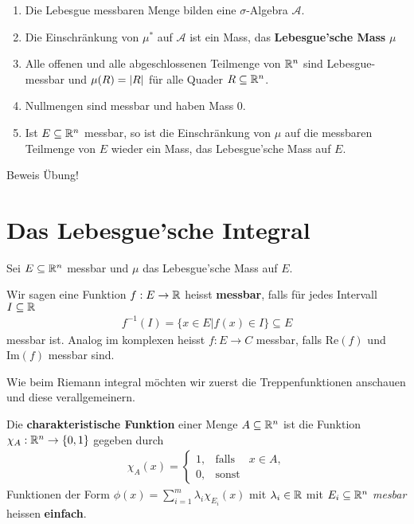 \begin{satz}[]
\begin{enumerate}
\item Die Lebesgue messbaren Menge bilden eine $\sigma$-Algebra $ \mathcal{A}$.
\item Die Einschränkung von $\mu^*$ auf $ \mathcal{A}$ ist ein Mass, das \textbf{Lebesgue'sche Mass} $\mu$
\item Alle offenen und alle abgeschlossenen Teilmenge von $\mathbb{R}^n$ sind Lebesgue-messbar und $\mu(R) = \vert R\vert$ für alle Quader $R \subseteq \mathbb{R}^n$. 
\item Nullmengen sind messbar und haben Mass $0$.
\item Ist $E \subseteq \mathbb{R}^n$ messbar, so ist die Einschränkung von $\mu$ auf die messbaren Teilmenge von $E$ wieder ein Mass, das Lebesgue'sche Mass auf $E$.
\end{enumerate}
\end{satz}
Beweis Übung! 


\section{Das Lebesgue'sche Integral}
 
Sei $E \subseteq \mathbb{R}^n$ messbar und $\mu$ das Lebesgue'sche Mass auf $E$.


\begin{definition}[]
Wir sagen eine Funktion $f: E \to \mathbb{R}$ heisst \textbf{messbar}, falls für jedes Intervall $I \subseteq \mathbb{R}$ 
\begin{align*}
				f^{-1}(I) = \{x \in E \big\vert f(x) \in I\} \subseteq E
\end{align*}
messbar ist. Analog im komplexen heisst $f: E \to C$ messbar, falls $ \text{Re}(f)$ und $ \text{Im}(f)$ messbar sind.
\end{definition}

Wie beim Riemann integral möchten wir zuerst die Treppenfunktionen anschauen und diese verallgemeinern.

\begin{definition}[]
				Die \textbf{charakteristische Funktion} einer Menge $A \subseteq \mathbb{R}^n$  ist die Funktion $\chi_A: \mathbb{R}^n \to \{0,1\}$ gegeben durch
	\begin{align*}
		\chi_A(x) = \left\{\begin{array}{rcl}
						1, &\text{falls}& x \in A, \\
						0, &\text{sonst}&  
		\end{array} \right.
	\end{align*}
	Funktionen der Form $\phi(x) = \sum_{i = 1}^{m} \lambda_i \chi_{E_i}(x)$ mit $\lambda_i \in \mathbb{R}$ mit $E_i \subseteq \mathbb{R}^n$ \emph{mesbar} heissen \textbf{einfach}.
\end{definition}

